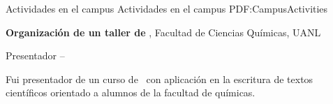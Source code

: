 \Section
{Actividades en el campus}
{Actividades en el campus}
{PDF:CampusActivities}

\Entry
{\textbf{Organización de un taller de \XeLaTeX}},
Facultad de Ciencias Químicas, UANL

\Gap
\BulletItem
Presentador
\hfill
{} -- 
\begin{Detail}
	\SubBulletItem
	Fui presentador de un curso de \XeLaTeX~con aplicación en la escritura de textos científicos orientado a alumnos de la facultad de químicas.
\end{Detail}
